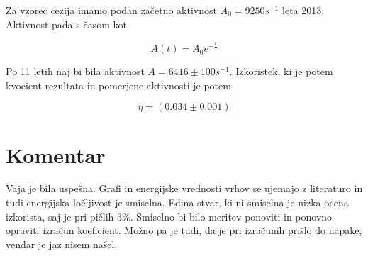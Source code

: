 \documentclass[11pt]{article}
\begin{document}
Za vzorec cezija imamo podan začetno aktivnost \(A_0 = 9250 s^{-1}\) leta 2013. Aktivnost pada s časom kot

\[ A(t) = A_0 e^{- \frac{t}{\tau}}
\]

Po 11 letih naj bi bila aktivnost \(A = 6416 \pm 100 s ^{-1}\). Izkoristek, ki je potem kvocient rezultata in pomerjene aktivnosti je potem

\[ \eta = (0.034 \pm 0.001)
\]
\section{Komentar}\label{sec:orgacaf9d4}

Vaja je bila uspešna. Grafi in energijske vrednosti vrhov se ujemajo z literaturo in tudi energijska ločljivost je smiselna. Edina stvar, ki ni smiselna je nizka ocena izkorista, saj je pri pičlih \(3 \%\). Smiselno bi bilo meritev ponoviti in ponovno opraviti izračun koeficient. Možno pa je tudi, da je pri izračunih prišlo do napake, vendar je jaz nisem našel.

\printbibliography[heading=bibintoc]
\end{document}
